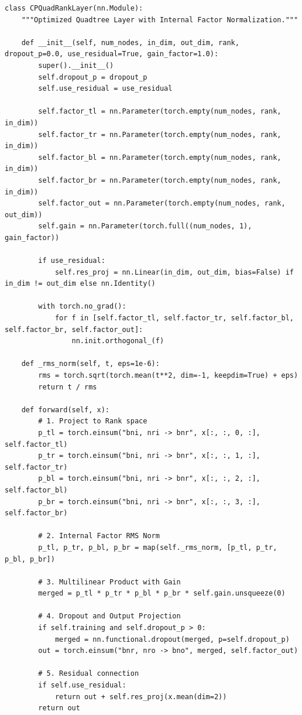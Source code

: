 \documentclass[12pt, a4paper, oneside]{report}
\begin{document}
\begin{verbatim}
class CPQuadRankLayer(nn.Module):
    """Optimized Quadtree Layer with Internal Factor Normalization."""
    
    def __init__(self, num_nodes, in_dim, out_dim, rank, dropout_p=0.0, use_residual=True, gain_factor=1.0):
        super().__init__()
        self.dropout_p = dropout_p
        self.use_residual = use_residual

        self.factor_tl = nn.Parameter(torch.empty(num_nodes, rank, in_dim))
        self.factor_tr = nn.Parameter(torch.empty(num_nodes, rank, in_dim))
        self.factor_bl = nn.Parameter(torch.empty(num_nodes, rank, in_dim))
        self.factor_br = nn.Parameter(torch.empty(num_nodes, rank, in_dim))
        self.factor_out = nn.Parameter(torch.empty(num_nodes, rank, out_dim))
        self.gain = nn.Parameter(torch.full((num_nodes, 1), gain_factor))

        if use_residual:
            self.res_proj = nn.Linear(in_dim, out_dim, bias=False) if in_dim != out_dim else nn.Identity()

        with torch.no_grad():
            for f in [self.factor_tl, self.factor_tr, self.factor_bl, self.factor_br, self.factor_out]:
                nn.init.orthogonal_(f)

    def _rms_norm(self, t, eps=1e-6):
        rms = torch.sqrt(torch.mean(t**2, dim=-1, keepdim=True) + eps)
        return t / rms

    def forward(self, x):
        # 1. Project to Rank space
        p_tl = torch.einsum("bni, nri -> bnr", x[:, :, 0, :], self.factor_tl)
        p_tr = torch.einsum("bni, nri -> bnr", x[:, :, 1, :], self.factor_tr)
        p_bl = torch.einsum("bni, nri -> bnr", x[:, :, 2, :], self.factor_bl)
        p_br = torch.einsum("bni, nri -> bnr", x[:, :, 3, :], self.factor_br)

        # 2. Internal Factor RMS Norm
        p_tl, p_tr, p_bl, p_br = map(self._rms_norm, [p_tl, p_tr, p_bl, p_br])

        # 3. Multilinear Product with Gain
        merged = p_tl * p_tr * p_bl * p_br * self.gain.unsqueeze(0)

        # 4. Dropout and Output Projection
        if self.training and self.dropout_p > 0:
            merged = nn.functional.dropout(merged, p=self.dropout_p)
        out = torch.einsum("bnr, nro -> bno", merged, self.factor_out)

        # 5. Residual connection
        if self.use_residual:
            return out + self.res_proj(x.mean(dim=2))
        return out
\end{verbatim}
\end{document}
